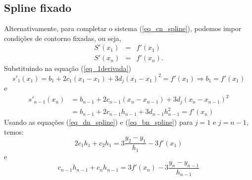 \documentclass[main.tex]{subfiles}
\begin{document}
\subsection{Spline fixado}

Alternativamente, para completar o sistema (\ref{eq_cn_spline}), podemos impor condições de contorno fixadas, ou seja,
\begin{eqnarray*}
S'(x_1)&=&f'(x_1)\\
S'(x_n)&=&f'(x_n).
\end{eqnarray*}
Substituindo na equação (\ref{eq_1derivada})
\begin{equation}
s'_1(x_1)=b_1+2c_1(x_1-x_1)+3d_j(x_1-x_1)^2=f'(x_1)\Longrightarrow b_1=f'(x_1)  
\end{equation}
e
\begin{equation}
  \begin{split}
s'_{n-1}(x_n) &= b_{n-1}+2c_{n-1}(x_n-x_{n-1})+3d_j(x_n-x_{n-1})^2 \\
&= b_{n-1}+2c_{n-1}h_{n-1}+3d_{n-1}h_{n-1}^2=f'(x_n)
  \end{split}
\end{equation}
Usando as equações (\ref{eq_dn_spline}) e (\ref{eq_bn_spline}) para $j=1$ e $j=n-1$, temos:
\begin{equation}
2c_1h_1+c_{2}h_1=3\frac{y_{2}-y_1}{h_1}-3f'(x_1)  
\end{equation}
e
\begin{equation}
c_{n-1}h_{n-1}+c_{n}h_{n-1}=3f'(x_n)-3\frac{y_{n}-y_{n-1}}{h_{n-1}}  
\end{equation}
\end{document}
